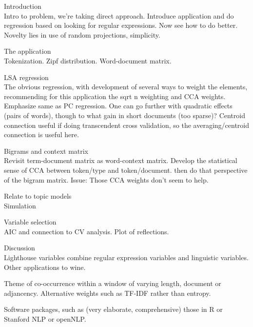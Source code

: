 \documentclass[10pt]{article}
\begin{document}
\begin{description}
\item{Introduction} \\ Intro to problem, we're taking direct approach.
  Introduce application and do regression based on looking for regular
 expressions.  Now see how to do better.  Novelty lies in use of random
 projections, simplicity.
\item{ The application } \\ 

 Tokenization.  Zipf distribution.  Word-document matrix. 

\item{LSA regression} \\ 

 The obvious regression, with development of several ways to weight the
 elements, recommending for this application the sqrt n weighting and CCA
 weights.  Emphasize same as PC regression.  One can go further with quadratic
 effects (pairs of words), though to what gain in short documents (too sparse)?
  Centroid connection useful if doing transcendent cross validation, so the
 averaging/centroid connection is useful here.

\item{Bigrams and context matrix} \\ 
 
 Revisit term-document matrix as word-context matrix.  Develop the statistical
 sense of CCA between token/type and token/document.  then do that perspective
 of the bigram matrix.  Issue: Those CCA weights don't seem to help.

\item{Relate to topic models} \\ 
 Simulation

\item{Variable selection}  \\
 AIC and connection to CV analysis.  Plot of reflections.

\item{Discussion}  \\
Lighthouse variables combine regular expression variables and linguistic variables. Other applications to wine.

\end{description}

 Theme of co-occurrence within a window of varying length, document or
adjancency.  Alternative weights such as TF-IDF rather than entropy.

 Software packages, such as (very elaborate, comprehensive) those in R
 \citep[tm][]{feinerer08} or Stanford NLP or openNLP.
\end{document}
